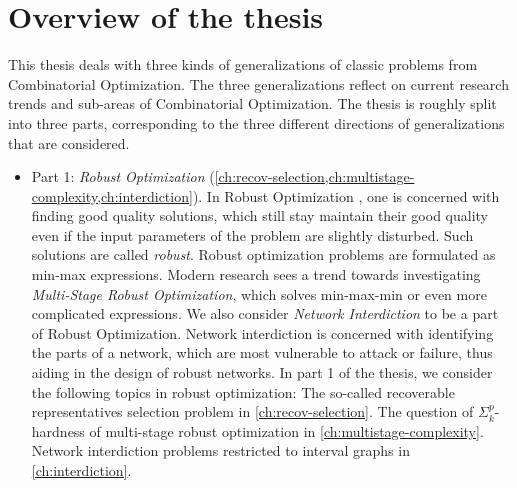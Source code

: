 \section{Overview of the thesis}

This thesis deals with three kinds of generalizations of classic problems from Combinatorial Optimization. 
The three generalizations reflect on current research trends and sub-areas of Combinatorial Optimization. 
The thesis is roughly split into three parts, corresponding to the three different directions of generalizations that are considered.

\begin{itemize}
\item Part 1: \emph{Robust Optimization} (\cref{ch:recov-selection,ch:multistage-complexity,ch:interdiction}). In Robust Optimization \cite{ben2009robust}, one is concerned with finding good quality solutions, 
which still stay maintain their good quality even if the input parameters of the problem are slightly disturbed. Such solutions are called \emph{robust}.
Robust optimization problems are formulated as min-max expressions. Modern research sees a trend towards investigating \emph{Multi-Stage Robust Optimization}, which solves min-max-min or even more complicated expressions.
 We also consider \emph{Network Interdiction} to be a part of Robust Optimization. 
Network interdiction is concerned with identifying the parts of a network, which are most vulnerable to attack or failure, thus aiding in the design of robust networks. 
In part 1 of the thesis, we consider the following topics in robust optimization: The so-called recoverable representatives selection problem in \cref{ch:recov-selection}. The question of $\Sigma^p_k$-hardness of multi-stage robust optimization in \cref{ch:multistage-complexity}. 
Network interdiction problems restricted to interval graphs in \cref{ch:interdiction}.


\end{itemize}
